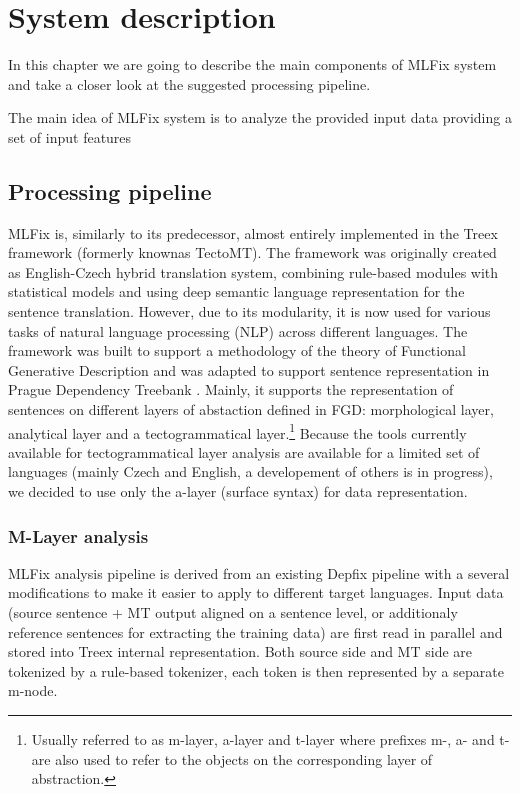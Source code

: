 \chapter{System description}
\label{chap:system_descr}

In this chapter we are going to describe the main components
of MLFix system and take a closer look at the suggested processing pipeline.

The main idea of MLFix system is to analyze the provided input data providing
a set of input features 

\section{Processing pipeline}

MLFix is, similarly to its predecessor, almost entirely implemented in the
Treex \citep{Popel:2010:TMN:1884371.1884406}
framework (formerly knownas TectoMT).
The framework was originally created as English-Czech hybrid translation system, combining
rule-based modules with statistical models and using deep semantic language representation
for the sentence translation. However, due to its modularity, it is
now used for various tasks of natural language processing (NLP) across different
languages. The framework was built to support a methodology of the theory of Functional Generative Description \citep{Sgall1967}
and was adapted to support sentence representation in Prague Dependency Treebank \citep{pdt20:2006}.
Mainly, it supports the representation of sentences on different layers of abstaction defined in FGD: morphological layer,
analytical layer and a tectogrammatical layer.\footnote{Usually referred to as m-layer, a-layer and t-layer where prefixes m-, a- and t- are also used to refer to the objects on the corresponding layer of abstraction.}
Because the tools currently available for tectogrammatical layer analysis are available for
a limited set of languages (mainly Czech and English, a developement of others is in progress),
we decided to use only the a-layer (surface syntax) for data representation.

\subsection{M-Layer analysis}

MLFix analysis pipeline is derived from an existing Depfix pipeline
with a several modifications to make it easier to apply to different
target languages. Input data (source sentence + MT output aligned on a sentence level,
or additionaly reference sentences for extracting the training data)
are first read in parallel and stored into Treex internal representation.
Both source side and MT side are tokenized by a rule-based tokenizer, each token is then
represented by a separate m-node.


